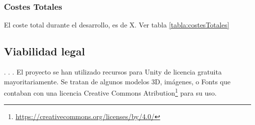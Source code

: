
\subsubsection{Costes Totales}
	El coste total durante el desarrollo, es de X. Ver tabla \ref{tabla:costesTotales}

\subsection{Viabilidad legal}

.
.
.
El proyecto se han utilizado recursos para Unity de licencia gratuita mayoritariamente. Se tratan de algunos modelos 3D, imágenes, o Fonts que contaban con una licencia Creative Commons Atribution\footnote{\url{https://creativecommons.org/licenses/by/4.0/}} para su uso.

